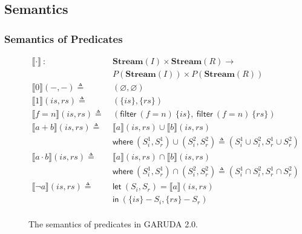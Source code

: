 \documentclass[12pt, letterpaper]{article}
\let\emptyset\varnothing
\newcommand\interp[1]{\llbracket #1 \rrbracket}
\def \sysname {\textsc{GARUDA 2.0}\xspace}
\begin{document}
    \clearpage
    \subsection{Semantics}\label{sec:spec:sem}
      \subsubsection{Semantics of Predicates}\label{sec:spec:sem:pred}
    
        \begin{figure}
          \centering
          \begin{align*}
            \interp{ \cdot }\ 
              :\ \ &
              \mathbf{Stream}(I)\times \mathbf{Stream}(R) \rightarrow \\
              & P(\mathbf{Stream}(I))\times P(\mathbf{Stream}(R)) 
              \\
            \interp{ 0 }(-, -)
              \triangleq\ &
              (\emptyset , \emptyset)
              \\ %
            \interp{ 1 }(\mathit{is}, \mathit{rs})
              \triangleq\ &
              (\{\mathit{is}\},\{\mathit{rs}\})
              \\
            \interp{ f=n }(\mathit{is}, \mathit{rs})
              \triangleq\ &
              (\mathsf{filter}\ (f=n)\ \{\mathit{is}\},\
               \mathsf{filter}\ (f=n)\ \{\mathit{rs}\}) 
              \\
            \interp{ a + b }(\mathit{is}, \mathit{rs})
              \triangleq\ &
              \interp { a }(\mathit{is}, \mathit{rs})\cup
              \interp { b }(\mathit{is}, \mathit{rs}) \\
              &\mathsf{where}\ (S_i^1, S_r^1)\cup (S_i^2, S_r^2)\triangleq
                (S_i^1\cup S_i^2, S_r^1\cup S_r^2)\\
            \interp { a \cdot b }(\mathit{is}, \mathit{rs})
              \triangleq\ &
              \interp { a }(\mathit{is}, \mathit{rs})\cap
              \interp { b }(\mathit{is}, \mathit{rs}) \\
              &\mathsf{where}\ (S_i^1, S_r^1)\cap (S_i^2, S_r^2)\triangleq
                (S_i^1\cap S_i^2, S_r^1\cap S_r^2)\\
            \interp { \neg a }(\mathit{is}, \mathit{rs})
              \triangleq\ &
              \mathsf{let}\ (S_i, S_r) = \interp {a}(\mathit{is}, \mathit{rs}) \\
              &\mathsf{in}\ (\{\mathit{is}\} - S_i, \{\mathit{rs}\} - S_r)
              \\
          \end{align*}
          \caption{The semantics of predicates in \sysname.}
          \label{fig:garuda:sem:pol}
        \end{figure}
\end{document}
